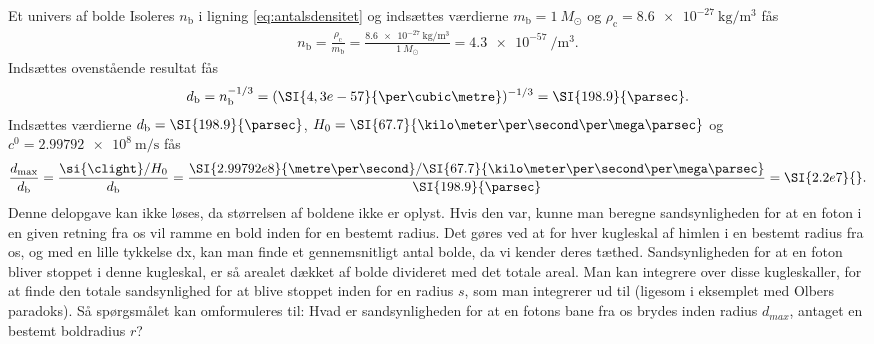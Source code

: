 \begin{opgave}{Et univers af bolde}
\opg Isoleres $n_\mathrm{b}$ i ligning \eqref{eq:antalsdensitet} og indsættes værdierne $m_\mathrm{b} = \SI{1}{M_\odot}$ og $\rho_\text{c} = \SI{8.6e-27}{\kilo\gram\per\cubic\metre}$ fås
%
\begin{align*}
    n_\mathrm{b} = \frac{\rho_\mathrm{c}}{m_\mathrm{b}} = \frac{\SI{8.6e-27}{\kilo\gram\per\cubic\metre}}{\SI{1}{M_\odot}} = \SI{4,3e-57}{\per\cubic\metre}.
\end{align*}
\opg Indsættes ovenstående resultat fås
%
\begin{align*}
    d_\mathrm{b} = n_\mathrm{b}^{-1/3} = (\SI{4,3e-57}{\per\cubic\metre})^{-1/3} = \SI{198.9}{\parsec}.
\end{align*}
\opg Indsættes værdierne $d_\mathrm{b} = \SI{198.9}{\parsec}$, $H_0 = \SI{67.7}{\kilo\meter\per\second\per\mega\parsec}$ og $\si{\clight} = \SI{2.99792e8}{\metre\per\second}$ fås
%
\begin{align*}
    \frac{d_\mathrm{max}}{d_\mathrm{b}} = \frac{\si{\clight}/H_0}{d_\mathrm{b}} = \frac{\SI{2.99792e8}{\metre\per\second}/\SI{67.7}{\kilo\meter\per\second\per\mega\parsec}}{\SI{198.9}{\parsec}} = \SI{2.2e7}{}.
\end{align*}
\opg Denne delopgave kan ikke løses, da størrelsen af boldene ikke er oplyst. Hvis den var, kunne man beregne sandsynligheden for at en foton i en given retning fra os vil ramme en bold inden for en bestemt radius. Det gøres ved at for hver kugleskal af himlen i en bestemt radius fra os, og med en lille tykkelse dx, kan man finde et gennemsnitligt antal bolde, da vi kender deres tæthed. Sandsynligheden for at en foton bliver stoppet i denne kugleskal, er så arealet dækket af bolde divideret med det totale areal. Man kan integrere over disse kugleskaller, for at finde den totale sandsynlighed for at blive stoppet inden for en radius $s$, som man integrerer ud til (ligesom i eksemplet med Olbers paradoks). Så spørgsmålet kan omformuleres til: Hvad er sandsynligheden for at en fotons bane fra os brydes inden radius $d_{max}$, antaget en bestemt boldradius $r$? %

\end{opgave}
